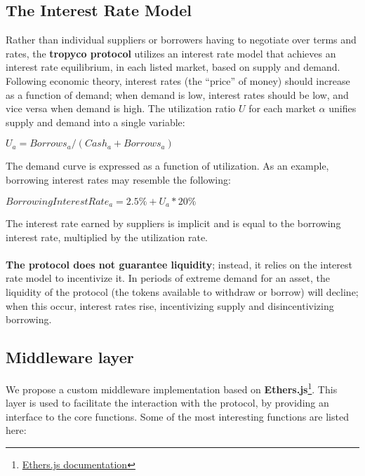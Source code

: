 \documentclass{article}
\begin{document}
\subsection{The Interest Rate Model}
Rather than individual suppliers or borrowers having to negotiate over terms and rates, the \textbf{tropyco protocol} utilizes an interest rate model that achieves an interest rate equilibrium, in each listed market, based on supply and demand. Following economic theory, interest rates (the “price” of money) should increase as a function of demand; when demand is low, interest rates should be low, and vice versa when demand is high. The utilization ratio \textbf{$U$} for each market \textbf{$\alpha$} unifies supply and demand into a single variable:
\begin{center}
$U_{a} = Borrows_{a} / (Cash_{a} + Borrows_{a})$
\end{center}
The demand curve is expressed as a function of utilization. As an example, borrowing interest rates may resemble the following:
\begin{center}
$Borrowing Interest Rate_{a}= 2.5\% + U_{a} * 20\%$
\end{center}
The interest rate earned by suppliers is implicit and is equal to the borrowing interest rate,
multiplied by the utilization rate.
\\ \\
\textbf{The protocol does not guarantee liquidity}; instead, it relies on the interest rate model to incentivize it. In periods of extreme demand for an asset, the liquidity of the protocol (the tokens available to withdraw or borrow) will decline; when this occur, interest rates rise, incentivizing supply and disincentivizing borrowing.

\subsection{Middleware layer}
We propose a custom middleware implementation based on \textbf{Ethers.js}\footnote{\href{https://ethers.io}{Ethers.js documentation}}. This layer is used to facilitate the interaction with the protocol, by providing an interface to the core functions. Some of the most interesting functions are listed here: \\
\end{document}
